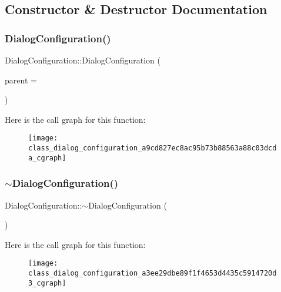 \subsection{Constructor \& Destructor Documentation}
\mbox{\label{class_dialog_configuration_a9cd827ec8ac95b73b88563a88c03dcda}} 
\subsubsection{Dialog\+Configuration()}
{\footnotesize\ttfamily Dialog\+Configuration\+::\+Dialog\+Configuration (\begin{DoxyParamCaption}\item[{Q\+Widget $\ast$}]{parent = {} }\end{DoxyParamCaption})\hspace{0.3cm}{\ttfamily [explicit]}}

Here is the call graph for this function\+:\nopagebreak
\begin{figure}[H]
\begin{center}
\leavevmode
\texttt{[image: class\_dialog\_configuration\_a9cd827ec8ac95b73b88563a88c03dcda\_cgraph]}
\end{center}
\end{figure}
\mbox{\label{class_dialog_configuration_a3ee29dbe89f1f4653d4435c5914720d3}} 
\subsubsection{$\sim$\+Dialog\+Configuration()}
{\footnotesize\ttfamily Dialog\+Configuration\+::$\sim$\+Dialog\+Configuration (\begin{DoxyParamCaption}{ }\end{DoxyParamCaption})}

Here is the call graph for this function\+:\nopagebreak
\begin{figure}[H]
\begin{center}
\leavevmode
\texttt{[image: class\_dialog\_configuration\_a3ee29dbe89f1f4653d4435c5914720d3\_cgraph]}
\end{center}
\end{figure}


